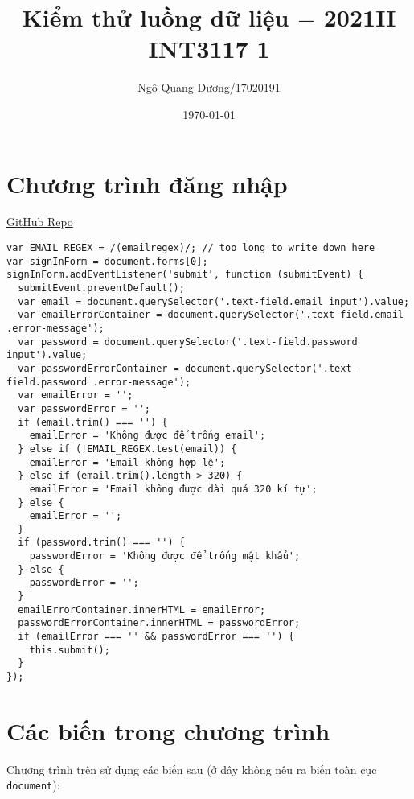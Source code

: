 \documentclass{article}
\title{\bf Kiểm thử luồng dữ liệu $-$ 2021II INT3117 1}
\author{Ngô Quang Dương/17020191}
\date{\today}
\begin{document}
\maketitle

\section{Chương trình đăng nhập}

\href{https://github.com/duong755/INT3117_1_2021II}{GitHub Repo}

\begin{verbatim}
var EMAIL_REGEX = /(emailregex)/; // too long to write down here
var signInForm = document.forms[0];
signInForm.addEventListener('submit', function (submitEvent) {
  submitEvent.preventDefault();
  var email = document.querySelector('.text-field.email input').value;
  var emailErrorContainer = document.querySelector('.text-field.email .error-message');
  var password = document.querySelector('.text-field.password input').value;
  var passwordErrorContainer = document.querySelector('.text-field.password .error-message');
  var emailError = '';
  var passwordError = '';
  if (email.trim() === '') {
    emailError = 'Không được để trống email';
  } else if (!EMAIL_REGEX.test(email)) {
    emailError = 'Email không hợp lệ';
  } else if (email.trim().length > 320) {
    emailError = 'Email không được dài quá 320 kí tự';
  } else {
    emailError = '';
  }
  if (password.trim() === '') {
    passwordError = 'Không được để trống mật khẩu';
  } else {
    passwordError = '';
  }
  emailErrorContainer.innerHTML = emailError;
  passwordErrorContainer.innerHTML = passwordError;
  if (emailError === '' && passwordError === '') {
    this.submit();
  }
});
\end{verbatim}

\section{Các biến trong chương trình}

\par Chương trình trên sử dụng các biến sau (ở đây không nêu ra biến toàn cục \texttt{document}):
\end{document}

